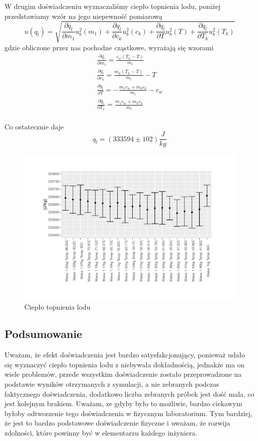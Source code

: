 \documentclass{article}
\begin{document}
\clearpage
W drugim doświadczeniu wyznaczaliśmy ciepło topnienia lodu, poniżej przedstawiamy wzór na jego niepewność pomiarową 
$$
    u(q_l) = \sqrt{
    \frac{\partial q_l}{\partial m_{1} } u^2_b(m_{1})+ 
    \frac{\partial q_l}{\partial c_{k} }  u^2_b(c_k) +
    \frac{\partial q_l}{\partial T } u^2_b(T) +
    \frac{\partial q_l}{\partial T_{k} } u^2_b(T_{k})
    }
$$
gdzie obliczone przez nas pochodne cząstkowe, wyrażają się wzorami
\begin{gather*}
    \frac{\partial q_l}{\partial m_{1} } = \frac{c_{w} (T_{k} - T) }{m_l}  \\
    \frac{\partial q_l}{\partial c_{k} } = \frac{m_k (T_{k} - T) }{m_l} - T \\
    \frac{\partial q_l}{\partial T } = - \frac{ m_{1} c_{w} + m_k c_{k} }{m_l} - c_w \\
    \frac{\partial q_l}{\partial T_{k} } = \frac{ m_{1} c_{w} + m_k c_{k} }{m_l}
\end{gather*}
\\Co ostatecznie daje
$$
q_l=(333594\pm 102)\frac{J}{kg}
$$

\begin{figure}[h!]
\centerline{\includegraphics[scale=0.7]{lod}}
\caption{Ciepło topnienia lodu}
\end{figure}

\pagebreak

\subsection{Podsumowanie}
Uważam, że efekt doświadczenia jest bardzo satysfakcjonujący, ponieważ udało się wyznaczyć ciepło topnienia lodu z niebywała dokładnością, jednakże ma on wiele problemów, przede wszystkim doświadczenie zostało przeprowadzone na podstawie wyników otrzymanych z symulacji, a nie zebranych podczas faktycznego doświadczenia, dodatkowo liczba zebranych próbek jest dość mala, co jest kolejnym brakiem. Uważam, ze gdyby  było to możliwie, bardzo ciekawym byłoby odtworzenie tego doświadczenia w fizycznym laboratorium. Tym bardziej, że jest to bardzo podstawowe doświadczenie fizyczne i uważam, że rozwija zdolności, które powinny być w elementarzu każdego inżyniera.
\end{document}
